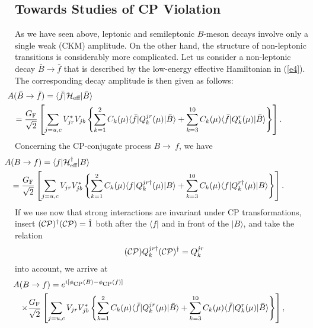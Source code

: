 \documentclass[11pt]{cernrep}
\begin{document}
%
%
%
\subsection{Towards Studies of CP Violation}\label{To-CP}
%
%
%
As we have seen above, leptonic and semileptonic $B$-meson decays
involve only a single weak (CKM) amplitude. On the other hand, the 
structure of non-leptonic transitions is considerably more complicated. 
Let us consider a non-leptonic decay $\bar B\to\bar f$ that is described by
the low-energy effective Hamiltonian  in (\ref{e4}). The corresponding
decay amplitude is then given as follows:
\begin{eqnarray}
\lefteqn{\hspace*{-1.3truecm}A(\bar B\to \bar f)=\langle \bar f\vert
{\cal H}_{\mbox{{\scriptsize eff}}}\vert\bar B\rangle}\nonumber\\
&&\hspace*{-1.3truecm}=\frac{G_{\mbox{{\scriptsize F}}}}{\sqrt{2}}\left[
\sum\limits_{j=u,c}V_{jr}^\ast V_{jb}\left\{\sum\limits_{k=1}^2
C_{k}(\mu)\langle \bar f\vert Q_{k}^{jr}(\mu)\vert\bar B\rangle
+\sum\limits_{k=3}^{10}C_{k}(\mu)\langle \bar f\vert Q_{k}^r(\mu)
\vert\bar B\rangle\right\}\right].~~~\mbox{}\label{Bbarfbar-ampl}
\end{eqnarray}
Concerning the CP-conjugate process $B\to\ f$, we have
\begin{eqnarray}
\lefteqn{\hspace*{-1.3truecm}A(B \to f)=\langle f|
{\cal H}_{\mbox{{\scriptsize 
eff}}}^\dagger|B\rangle}\nonumber\\
&&\hspace*{-1.3truecm}=\frac{G_{\mbox{{\scriptsize F}}}}{\sqrt{2}}
\left[\sum\limits_{j=u,c}V_{jr}V_{jb}^\ast \left\{\sum\limits_{k=1}^2
C_{k}(\mu)\langle f\vert Q_{k}^{jr\dagger}(\mu)\vert B\rangle
+\sum\limits_{k=3}^{10}C_{k}(\mu)\langle f\vert Q_k^{r\dagger}(\mu)
\vert B\rangle\right\}\right].~~~\mbox{}\label{Bf-ampl}
\end{eqnarray}
If we use now that strong interactions are invariant under CP transformations, 
insert $({\cal CP})^\dagger({\cal CP})=\hat 1$ both after the $\langle f|$ and in 
front of the $|B\rangle$, and take the relation 
\begin{equation}
({\cal CP})Q_k^{jr\dagger}({\cal CP})^\dagger=Q_k^{jr}
\end{equation}
into account, we arrive at
\begin{eqnarray}
\lefteqn{\hspace*{-1.3truecm}A(B \to f)=
e^{i[\phi_{\mbox{{\scriptsize CP}}}(B)-\phi_{\mbox{{\scriptsize CP}}}(f)]}}\nonumber\\
&&\hspace*{-1.3truecm}\times\frac{G_{\mbox{{\scriptsize F}}}}{\sqrt{2}}
\left[\sum\limits_{j=u,c}V_{jr}V_{jb}^\ast\left\{\sum\limits_{k=1}^2
C_{k}(\mu)\langle \bar f\vert Q_{k}^{jr}(\mu)\vert\bar B\rangle
+\sum\limits_{k=3}^{10}C_{k}(\mu)
\langle \bar f\vert Q_{k}^r(\mu)\vert\bar B\rangle\right\}\right],
\end{eqnarray}
\end{document}
